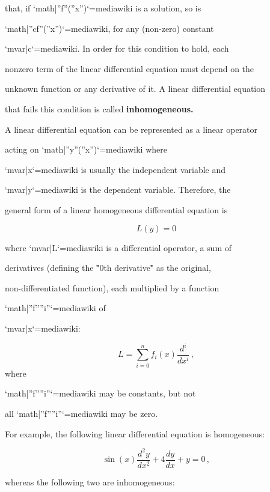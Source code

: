 that, if `{{math|''f''(''x'')}}`{=mediawiki} is a solution, so is

`{{math|''cf''(''x'')}}`{=mediawiki}, for any (non-zero) constant

`{{mvar|c}}`{=mediawiki}. In order for this condition to hold, each

nonzero term of the linear differential equation must depend on the

unknown function or any derivative of it. A linear differential equation

that fails this condition is called \textbf{inhomogeneous.}



A linear differential equation can be represented as a linear operator

acting on `{{math|''y''(''x'')}}`{=mediawiki} where

`{{mvar|x}}`{=mediawiki} is usually the independent variable and

`{{mvar|y}}`{=mediawiki} is the dependent variable. Therefore, the

general form of a linear homogeneous differential equation is



$$L(y) = 0$$



where `{{mvar|L}}`{=mediawiki} is a differential operator, a sum of

derivatives (defining the \""0th derivative\"" as the original,

non-differentiated function), each multiplied by a function

`{{math|''f''''i''}}`{=mediawiki} of

`{{mvar|x}}`{=mediawiki}:



$$L = \sum_{i=0}^n f_i(x)\frac{d^i}{dx^i} \, ,$$ where

`{{math|''f''''i''}}`{=mediawiki} may be constants, but not

all `{{math|''f''''i''}}`{=mediawiki} may be zero.



For example, the following linear differential equation is homogeneous:



$$\sin(x) \frac{d^2y}{dx^2} + 4 \frac{dy}{dx} + y = 0 \,,$$



whereas the following two are inhomogeneous:



